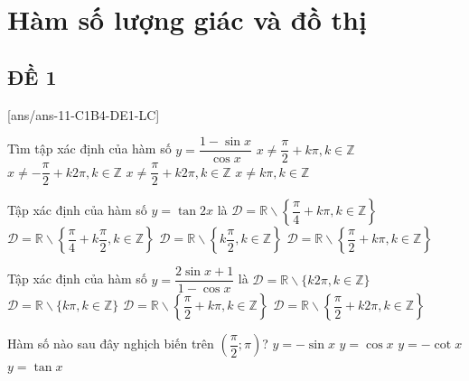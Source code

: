 \section{Hàm số lượng giác và đồ thị}

\subsection{ĐỀ 1}
[ans/ans-11-C1B4-DE1-LC]
\caulc
\begin{ex}%
Tìm tập xác định của hàm số $y=\dfrac{1-\sin x}{\cos x}$
\choice
{\True $x\ne \dfrac{\pi }{2}+k\pi, k\in \mathbb{Z} $}
{$x\ne -\dfrac{\pi }{2}+k2\pi, k\in \mathbb{Z} $ }
{$x\ne \dfrac{\pi }{2}+k2\pi, k\in \mathbb{Z}  $}
{$x\ne k\pi, k\in \mathbb{Z}  $}
\end{ex}
\begin{ex}%
Tập xác định của hàm số \( y = \tan 2x \) là
\choice
{\( \mathscr{D} = \mathbb{R}\backslash \left\{ \dfrac{\pi }{4}+k\pi ,k\in \mathbb{Z} \right\} \)}
{\True \( \mathscr{D} = \mathbb{R}\backslash \left\{ \dfrac{\pi }{4}+k\dfrac{\pi }{2},k\in \mathbb{Z} \right\} \)}
{\( \mathscr{D} = \mathbb{R}\backslash \left\{ k\dfrac{\pi }{2},k\in \mathbb{Z} \right\} \)}
{\( \mathscr{D} = \mathbb{R}\backslash \left\{ \dfrac{\pi }{2}+k\pi ,k\in \mathbb{Z} \right\} \)}
\end{ex}
\begin{ex}%
Tập xác định của hàm số $y=\dfrac{2\sin x+1}{1-\cos x}$ là
\choice
{\True $\mathscr{D} = \mathbb{R}\backslash\{k2\pi, k\in \mathbb{Z}\}  $}
{$\mathscr{D} = \mathbb{R}\backslash\{ k\pi, k\in \mathbb{Z} \} $}
{$\mathscr{D} = \mathbb{R}\backslash\left\{ \dfrac{\pi }{2}+k\pi, k\in \mathbb{Z} \right\} $}
{$\mathscr{D} = \mathbb{R}\backslash\left\{ \dfrac{\pi }{2}+k2\pi, k\in \mathbb{Z} \right\} $}
\end{ex}
\begin{ex}%
Hàm số nào sau đây nghịch biến trên $\left( \dfrac{\pi }{2};\pi \right)$?
\choice
{$y=-\sin x$}
{\True $y=\cos x$}
{$y=-\cot x$}
{$y=\tan x$}
\end{ex}
